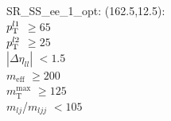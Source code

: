 SR\_SS\_ee\_1\_opt: (162.5,12.5): \\
$p_{\text{T}}^{l1}$ $\geq 65$ \\
$p_{\text{T}}^{l2}$ $\geq 25$ \\
$|\Delta\eta_{ll}|$ $<1.5$ \\
$m_{\text{eff}}$ $\geq 200$ \\
$m_{\text{T}}^{\text{max}}$ $\geq 125$ \\
$m_{lj}$/$m_{ljj}$ $<105$ \\
